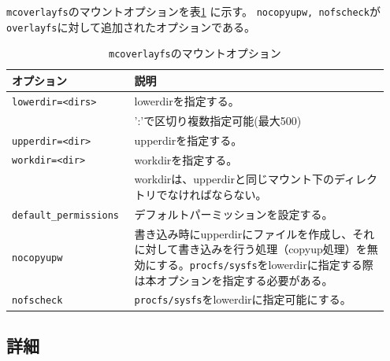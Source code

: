 \documentclass[twoside,11pt,fleqn]{book}
\begin{document}
\texttt{mcoverlayfs}のマウントオプションを表\ref{table:mcoverlayfs_options} に示す。
\texttt{nocopyupw, nofscheck}が\texttt{overlayfs}に対して追加されたオプションである。
\begin{table}[!h]
  \caption{\texttt{mcoverlayfs}のマウントオプション}
  \label{table:mcoverlayfs_options}
  \begin{tabular}{|p{0.30\linewidth}|p{0.65\linewidth}|} \hline
     オプション & 説明 \\ \hline
     \texttt{lowerdir=<dirs>}      & lowerdirを指定する。                  \\
                                   & ':'で区切り複数指定可能(最大500)      \\ \hline
     \texttt{upperdir=<dir>}       & upperdirを指定する。                  \\ \hline
     \texttt{workdir=<dir>}        & workdirを指定する。                   \\
                          & workdirは、upperdirと同じマウント下のディレクトリでなければならない。  \\ \hline
     \texttt{default\_permissions} & デフォルトパーミッションを設定する。  \\ \hline
     \texttt{nocopyupw}            & 書き込み時にupperdirにファイルを作成し、それに対して書き込みを行う処理（copyup処理）を無効にする。\texttt{procfs/sysfs}をlowerdirに指定する際は本オプションを指定する必要がある。      \\ \hline
     \texttt{nofscheck}            & \texttt{procfs/sysfs}をlowerdirに指定可能にする。  \\ \hline
  \end{tabular}
\end{table}
\FloatBarrier

\subsection{詳細}
\end{document}
